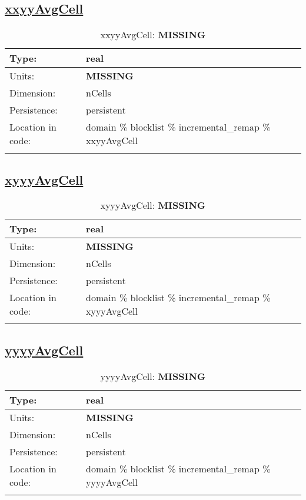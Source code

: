 \subsection[xxyyAvgCell]{\hyperref[sec:var_tab_incremental_remap]{xxyyAvgCell}}
\label{subsec:var_sec_incremental_remap_xxyyAvgCell}
\begin{center}
\begin{longtable}{| p{2.0in} | p{4.0in} |}
        \hline 
        Type: & real \\
        \hline 
        Units: & {\bf \color{red} MISSING} \\
        \hline 
        Dimension: & nCells \\
        \hline 
        Persistence: & persistent \\
        \hline 
         Location in code: & domain \% blocklist \% incremental\_remap \% xxyyAvgCell \\
         \hline 
    \caption{xxyyAvgCell: {\bf \color{red} MISSING}}
\end{longtable}
\end{center}
\subsection[xyyyAvgCell]{\hyperref[sec:var_tab_incremental_remap]{xyyyAvgCell}}
\label{subsec:var_sec_incremental_remap_xyyyAvgCell}
\begin{center}
\begin{longtable}{| p{2.0in} | p{4.0in} |}
        \hline 
        Type: & real \\
        \hline 
        Units: & {\bf \color{red} MISSING} \\
        \hline 
        Dimension: & nCells \\
        \hline 
        Persistence: & persistent \\
        \hline 
         Location in code: & domain \% blocklist \% incremental\_remap \% xyyyAvgCell \\
         \hline 
    \caption{xyyyAvgCell: {\bf \color{red} MISSING}}
\end{longtable}
\end{center}
\subsection[yyyyAvgCell]{\hyperref[sec:var_tab_incremental_remap]{yyyyAvgCell}}
\label{subsec:var_sec_incremental_remap_yyyyAvgCell}
\begin{center}
\begin{longtable}{| p{2.0in} | p{4.0in} |}
        \hline 
        Type: & real \\
        \hline 
        Units: & {\bf \color{red} MISSING} \\
        \hline 
        Dimension: & nCells \\
        \hline 
        Persistence: & persistent \\
        \hline 
         Location in code: & domain \% blocklist \% incremental\_remap \% yyyyAvgCell \\
         \hline 
    \caption{yyyyAvgCell: {\bf \color{red} MISSING}}
\end{longtable}
\end{center}
